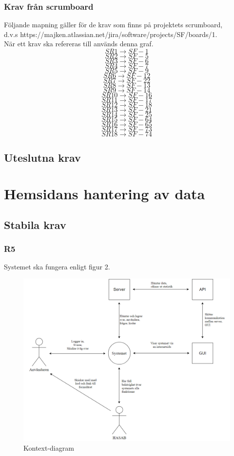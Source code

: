 \documentclass{article}
\begin{document}
\subsubsection*{Krav från scrumboard}
Följande mapning gäller för de krav som finns på projektets scrumboard,\\ d.v.s https://majken.atlassian.net/jira/software/projects/SF/boards/1.\\
När ett krav ska refereras till används denna graf.\\
$$SR1\rightarrow SF-1$$
$$SR2\rightarrow SF-5$$
$$SR3\rightarrow SF-6$$
$$SR4\rightarrow SF-7$$
$$SR5\rightarrow SF-9$$
$$SR6\rightarrow SF-12$$
$$SR7\rightarrow SF-22$$
$$SR8\rightarrow SF-13$$
$$SR9\rightarrow SF-14$$
$$SR10\rightarrow SF-16$$
$$SR11\rightarrow SF-17$$
$$SR12\rightarrow SF-18$$
$$SR13\rightarrow SF-21$$
$$SR14\rightarrow SF-25$$
$$SR15\rightarrow SF-64$$
$$SR16\rightarrow SF-65$$
$$SR17\rightarrow SF-73$$
$$SR18\rightarrow SF-74$$

    \subsection*{Uteslutna krav}
    
    \newpage
     \section{Hemsidans hantering av data}
    
    \subsection*{Stabila krav}
    \subsubsection*{R5}
    Systemet ska fungera enligt figur 2.
    
    \begin{figure}[h!]
    \includegraphics[width=150mm]{Kontextdiagram.png}
    \caption{Kontext-diagram}
    \end{figure}
    
\end{document}
